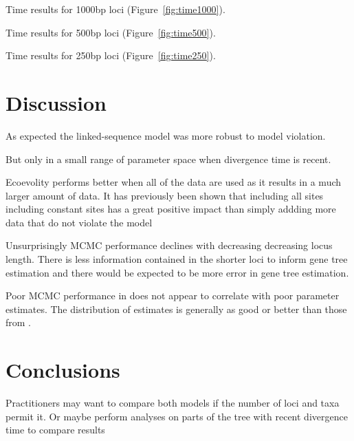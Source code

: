 Time results for 1000bp loci (Figure~\ref{fig:time1000}).

Time results for 500bp loci (Figure~\ref{fig:time500}).

Time results for 250bp loci (Figure~\ref{fig:time250}).

\section{Discussion}

As expected the linked-sequence model was more robust to model violation.

But only in a small range of parameter space when divergence time is recent.

Ecoevolity performs better when all of the data are used as it results in a much larger 
amount of data. It has previously been shown that including all sites including 
constant sites has a great positive impact than simply addding more data that 
do not violate the model \citep{Oaks2018ecoevolity}

Unsurprisingly MCMC performance declines with decreasing decreasing locus length.
There is less information contained in the shorter loci to inform gene tree estimation 
and there would be expected to be more error in gene tree estimation.

Poor MCMC performance in \beast does not appear to correlate with poor parameter 
estimates. The distribution of estimates is generally as good or better than those 
from \ecoevolity. 


\section{Conclusions}

Practitioners may want to compare both models if the number of loci and taxa
permit it. Or maybe perform analyses on parts of the tree with recent divergence
time to compare results 
